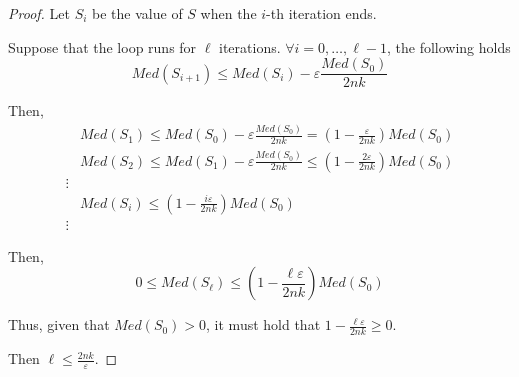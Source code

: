     \begin{proof}
        Let $S_i$ be the value of $S$ when the $i$-th iteration ends.

        Suppose that the loop runs for $\ell$ iterations.
        $\forall i = 0, \dots, \ell - 1$, the following holds
        \[ Med(S_{i+1}) \leq Med(S_i) - \varepsilon \frac{Med(S_0)}{2 n k} \]

        Then,
        \begin{equation*}
            \begin{split}
                &Med(S_1) \leq Med(S_0) - \varepsilon \frac{Med(S_0)}{2 n k} = (1 - \frac{\varepsilon}{2 n k}) Med(S_0)\\
                &Med(S_2) \leq Med(S_1) - \varepsilon \frac{Med(S_0)}{2 n k} \leq (1 - \frac{2 \varepsilon}{2 n k}) Med(S_0)\\
                \vdots\\
                &Med(S_i) \leq (1 - \frac{i \varepsilon}{2 n k}) Med(S_0)\\
                \vdots
            \end{split}
        \end{equation*}

        Then,
        \[ 0 \leq Med(S_\ell) \leq (1 - \frac{\ell \varepsilon}{2 n k}) Med(S_0) \]

        Thus, given that $Med(S_0) > 0$, it must hold that $1 - \frac{\ell \varepsilon}{2 n k} \geq 0$.
        
        Then $\ell \leq \frac{2 n k}{\varepsilon}$.
    \end{proof}